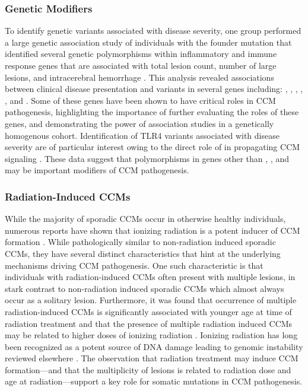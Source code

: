 \subsubsection{Genetic Modifiers}
To identify genetic variants associated with disease severity, one group performed a large genetic association study of individuals with the  founder mutation that identified several genetic polymorphisms within inflammatory and immune response genes that are associated with total lesion count, number of large lesions, and intracerebral hemorrhage \citep{choquet2014}. This analysis revealed associations between clinical disease presentation and variants in several genes including: , , , , , and . Some of these genes have been shown to have critical roles in CCM pathogenesis, highlighting the importance of further evaluating the roles of these genes, and demonstrating the power of association studies in a genetically homogenous cohort. Identification of TLR4 variants associated with disease severity are of particular interest owing to the direct role of  in propagating CCM signaling \citep{tang2019}. These data suggest that polymorphisms in genes other than , , and  may be important modifiers of CCM pathogenesis. 

\subsubsection{Radiation-Induced CCMs}
While the majority of sporadic CCMs occur in otherwise healthy individuals, numerous reports have shown that ionizing radiation is a potent inducer of CCM formation \citep{cutsforthgregory2015, heckl2002, jain2005, burn2007, strenger2008, vinchon2011, koike2012, martinezlage2008, novelli1997, baumgartner2003}. While pathologically similar to non-radiation induced sporadic CCMs, they have several distinct characteristics that hint at the underlying mechanisms driving CCM pathogenesis. One such characteristic is that individuals with radiation-induced CCMs often present with multiple lesions, in stark contrast to non-radiation induced sporadic CCMs which almost always occur as a solitary lesion. Furthermore, it was found that occurrence of multiple radiation-induced CCMs is significantly associated with younger age at time of radiation treatment \citep{cutsforthgregory2015} and that the presence of multiple radiation induced CCMs may be related to higher doses of ionizing radiation \citep{novelli1997}. Ionizing radiation has long been recognized as a potent source of DNA damage leading to genomic instability reviewed elsewhere \citep{little1998}. The observation that radiation treatment may induce CCM formation---and that the multiplicity of lesions is related to radiation dose and age at radiation---support a key role for somatic mutations in CCM pathogenesis.

